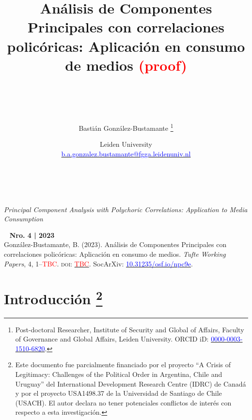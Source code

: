 \documentclass[a4paper]{tufte-handout}
\title{Análisis de Componentes Principales con correlaciones policóricas: Aplicación en consumo de medios \textcolor{red}{(proof)} \\~\\~\\}
\author{{\normalfont Bastián González-Bustamante} \thanks{Post-doctoral Researcher, Institute of Security and Global of Affairs, Faculty of Governance and Global Affairs, Leiden University. ORCID iD: \href{https://orcid.org/0000-0003-1510-6820}{\textcolor{blue}{0000-0003-1510-6820}}.}}
\date{{\normalfont \normalsize \vspace{-1mm}Leiden University} \\ {\LARGE \Letter} \href{mailto:b.a.gonzalez.bustamante@fgga.leidenuniv.nl}{\textcolor{blue}{\normalfont \normalsize b.a.gonzalez.bustamante@fgga.leidenuniv.nl}}
}
\begin{document}
\maketitle

\vspace{8mm}
\\~\\

{\noindent \LARGE \itshape Principal Component Analysis with Polychoric Correlations: Application to Media Consumption}\\



~\vfill
{\noindent \bfseries Nro. 4 | 2023}\\
{\noindent González-Bustamante, B. (2023). Análisis de Componentes Principales con correlaciones policóricas: Aplicación en consumo de medios. {\itshape Tufte Working Papers}, 4, 1--\textcolor{red}{TBC}. {\scshape doi:} \href{https://training-datalab.com/tufte-working-papers/}{\textcolor{red}{TBC}}. {\small SocArXiv:} \href{https://doi.org/10.31235/osf.io/npc9e}{\textcolor{blue}{10.31235/osf.io/npc9e}}.}
\pagebreak


\section[Introducción] {{\normalfont Introducción} \footnote{Este documento fue parcialmente financiado por el proyecto “A Crisis of Legitimacy: Challenges of the Political Order in Argentina, Chile and Uruguay” del International Development Research Centre (IDRC) de Canadá y por el proyecto USA1498.37 de la Universidad de Santiago de Chile (USACH). El autor declara no tener potenciales conflictos de interés con respecto a esta investigación.}}

\end{document}
